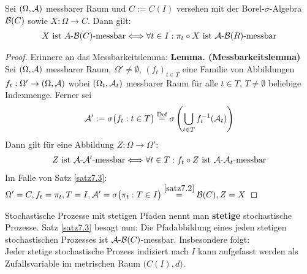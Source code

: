 \begin{satz}\label{satz7.3}
Sei $(\Omega,\mathcal{A})$ messbarer Raum und $C:=C(I)$ versehen mit der Borel-$\sigma$-Algebra $\mathcal{B}(C)$ sowie $X:\Omega\to C$. Dann gilt:
\begin{align*}
X\text{ ist }A\text{-}\mathcal{B}(C)\text{-messbar}\Longleftrightarrow\forall t\in I:\pi_t\circ X\text { ist }\mathcal{A}\text{-}\mathcal{B}(R)\text{-messbar}
\end{align*}
\end{satz}
\begin{proof}
Erinnere an das Messbarkeitslemma:\nl
\textbf{Lemma. (Messbarkeitslemma)}\\
Sei $(\Omega,\mathcal{A})$ messbarer Raum, $\Omega'\neq\emptyset$, $(f_t)_{t\in T}$ eine Familie von Abbildungen\\ $f_t:\Omega'\to(\Omega,\mathcal{A})$ wobei $(\Omega_t,\mathcal{A}_t)$ messbarer Raum für alle $t\in T$, $T\neq\emptyset$ beliebige Indexmenge. Ferner sei
\begin{align*}
\mathcal{A}':=\sigma\big(f_t:t\in T\big)\stackrel{\text{Def}}{=}\sigma\left(\bigcup\limits_{t\in T} f_t^{-1}(\mathcal{A}_t)\right)
\end{align*}
Dann gilt für eine Abbildung $Z:\Omega\to\Omega'$:
\begin{align*}
Z\text{ ist }\mathcal{A}\text{-}\mathcal{A}'\text{-messbar}\Longleftrightarrow\forall t\in T: f_t\circ Z\text{ ist }\mathcal{A}\text{-}\mathcal{A}_t\text{-messbar}
\end{align*}
Im Falle von Satz \ref{satz7.3}: $\Omega'=C, f_t=\pi_t, T=I,\mathcal{A}'=\sigma\big(\pi_t:T\in I\big)\stackrel{\ref{satz7.2}}{=}\mathcal{B}(C),Z=X$
\end{proof}

Stochastische Prozesse mit stetigen Pfaden nennt man \textbf{stetige} stochastische Prozesse. Satz \ref{satz7.3} besagt nun: Die Pfadabbildung eines jeden stetigen stochastischen Prozesses ist $\mathcal{A}\text{-}\mathcal{B}(C)$-messbar. Insbesondere folgt:\\
Jeder stetige stochastische Prozess indiziert nach $I$ kann aufgefasst werden als Zufallsvariable im metrischen Raum $\big(C(I),d\big)$.


